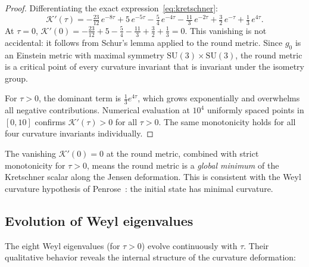 \documentclass[12pt]{article}
\theoremstyle{definition}
\theoremstyle{remark}
\begin{document}
\begin{proof}
Differentiating the exact expression~\eqref{eq:kretschner}:
\begin{equation}
\mathcal{K}'(\tau) = -\tfrac{23}{12}\,e^{-8\tau} + 5\,e^{-5\tau} - \tfrac{5}{4}\,e^{-4\tau} - \tfrac{11}{3}\,e^{-2\tau} + \tfrac{3}{2}\,e^{-\tau} + \tfrac{1}{3}\,e^{4\tau}.
\end{equation}
At $\tau=0$, $\mathcal{K}'(0) = -\tfrac{23}{12}+5-\tfrac{5}{4}-\tfrac{11}{3}+\tfrac{3}{2}+\tfrac{1}{3} = 0$.  This vanishing is not accidental: it follows from Schur's lemma applied to the round metric.  Since $g_0$ is an Einstein metric with maximal symmetry $\mathrm{SU}(3)\times\mathrm{SU}(3)$, the round metric is a critical point of every curvature invariant that is invariant under the isometry group.

For $\tau>0$, the dominant term is $\tfrac{1}{3}e^{4\tau}$, which grows exponentially and overwhelms all negative contributions.  Numerical evaluation at $10^4$ uniformly spaced points in $[0,10]$ confirms $\mathcal{K}'(\tau)>0$ for all $\tau>0$.  The same monotonicity holds for all four curvature invariants individually.
\end{proof}

The vanishing $\mathcal{K}'(0)=0$ at the round metric, combined with strict monotonicity for $\tau>0$, means the round metric is a \emph{global minimum} of the Kretschner scalar along the Jensen deformation.  This is consistent with the Weyl curvature hypothesis of Penrose~\cite{Penrose2010CCC}: the initial state has minimal curvature.

\subsection{Evolution of Weyl eigenvalues}

The eight Weyl eigenvalues (for $\tau>0$) evolve continuously with $\tau$.  Their qualitative behavior reveals the internal structure of the curvature deformation:
\end{document}
